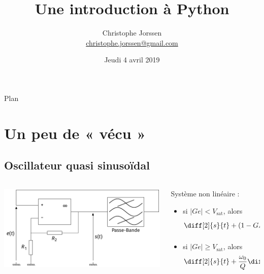 \documentclass[10pt,aspectratio=169]{beamer}
\title{Une introduction à Python}
\institute[]{Lycée Jacques Decour -- Paris}
\author[C. Jorssen]{%
  Christophe Jorssen\\
  \footnotesize\href{mailto:christophe.jorssen@gmail.com}{christophe.jorssen@gmail.com}}
\date{Jeudi 4 avril 2019}
\begin{document}
\begin{frame}
  \titlepage
\end{frame}

\begin{frame}
\end{frame}

\begin{frame}{Plan}
  \tableofcontents[hideallsubsections]
\end{frame}

\section{Un peu de « vécu »}



\subsection{Oscillateur quasi sinusoïdal}

\begin{frame}
  \begin{columns}
    \begin{column}{.5\linewidth}
    \includegraphics[width = \linewidth]{schema-oscillateur-QS-boucle}
  \end{column}
  \begin{column}{.5\linewidth}
    Système non linéaire :
    \begin{itemize}
    \item si $|G e| < V_{\mathrm{sat}}$, alors $$\diff[2]{s}{t} + (1 - G H_0) \frac{\omega_0}{Q} \diff{s}{t} + \omega_0^2 s = 0 ;$$
    \item si $|G e| \geqslant V_{\mathrm{sat}}$, alors $$\diff[2]{s}{t} + \frac{\omega_0}{Q} \diff{s}{t} + \omega_0^2 s = 0.$$
    \end{itemize}

  \end{column}
\end{columns}
\end{frame}
\end{document}
